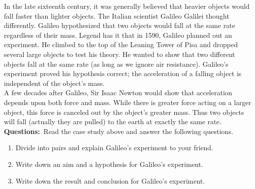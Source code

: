 {In the late sixteenth century, it was generally believed that heavier objects would fall faster than lighter objects. The Italian scientist Galileo Galilei thought differently. Galileo hypothesized that two objects would fall at the same rate regardless of their mass. Legend has it that in 1590, Galileo planned out an experiment. He climbed to the top of the Leaning Tower of Pisa and dropped several large objects to test his theory. He wanted to show that two different objects fall at the same rate (as long as we ignore air resistance). Galileo's experiment proved his hypothesis correct; the acceleration of a falling object is independent of the object's mass.\\ A few decades after Galileo, Sir Isaac Newton would show that acceleration depends upon both force and mass. While there is greater force acting on a larger object, this force is canceled out by the object's greater mass. Thus two objects will fall (actually they are pulled) to the earth at exactly the same rate.\\
\textbf{Questions:}~Read the case study above and answer the following questions.\\ \begin{enumerate}
\item Divide into pairs and explain Galileo's experiment to your friend. 
\item Write down an aim and a hypothesis for Galileo's experiment.
\item Write down the result and conclusion for Galileo's experiment.
\end{enumerate}
}


